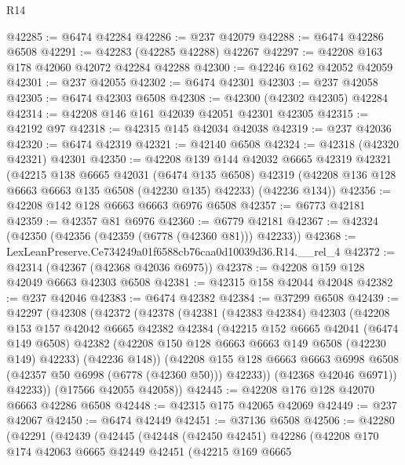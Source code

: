 \begin{lexlean}{R14}
\begin{coremodule}
@42285 := @6474 @42284
@42286 := @237 @42079
@42288 := @6474 @42286 @6508
@42291 := @42283 (@42285 @42288) @42267
@42297 := @42208 @163 @178 @42060 @42072 @42284 @42288
@42300 := @42246 @162 @42052 @42059
@42301 := @237 @42055
@42302 := @6474 @42301
@42303 := @237 @42058
@42305 := @6474 @42303 @6508
@42308 := @42300 (@42302 @42305) @42284
@42314 := @42208 @146 @161 @42039 @42051 @42301 @42305
@42315 := @42192 @97
@42318 := @42315 @145 @42034 @42038
@42319 := @237 @42036
@42320 := @6474 @42319
@42321 := @42140 @6508
@42324 := @42318 (@42320 @42321) @42301
@42350 := @42208
    @139
    @144
    @42032
    @6665
    @42319
    @42321
    (@42215
      @138
      @6665
      @42031
      (@6474 @135 @6508)
      @42319
      (@42208 @136 @128 @6663 @6663 @135 @6508 (@42230 @135) @42233)
      (@42236 @134))
@42356 := @42208 @142 @128 @6663 @6663 @6976 @6508
@42357 := @6773 @42181
@42359 := @42357 @81 @6976
@42360 := @6779 @42181
@42367 := @42324 (@42350 (@42356 (@42359 (@6778 (@42360 @81))) @42233))
@42368 := LexLeanPreserve.Ce734249a01f6588cb76caa0d10039d36.R14.__rel_4
@42372 := @42314 (@42367 (@42368 @42036 @6975))
@42378 := @42208 @159 @128 @42049 @6663 @42303 @6508
@42381 := @42315 @158 @42044 @42048
@42382 := @237 @42046
@42383 := @6474 @42382
@42384 := @37299 @6508
@42439 := @42297
    (@42308
      (@42372
        (@42378
          (@42381
            (@42383 @42384)
            @42303
            (@42208
              @153
              @157
              @42042
              @6665
              @42382
              @42384
              (@42215
                @152
                @6665
                @42041
                (@6474 @149 @6508)
                @42382
                (@42208 @150 @128 @6663 @6663 @149 @6508 (@42230 @149) @42233)
                (@42236 @148))
              (@42208
                @155
                @128
                @6663
                @6663
                @6998
                @6508
                (@42357 @50 @6998 (@6778 (@42360 @50)))
                @42233))
            (@42368 @42046 @6971))
          @42233))
      (@17566 @42055 @42058))
@42445 := @42208 @176 @128 @42070 @6663 @42286 @6508
@42448 := @42315 @175 @42065 @42069
@42449 := @237 @42067
@42450 := @6474 @42449
@42451 := @37136 @6508
@42506 := @42280
    (@42291
      (@42439
        (@42445
          (@42448
            (@42450 @42451)
            @42286
            (@42208
              @170
              @174
              @42063
              @6665
              @42449
              @42451
              (@42215
                @169
                @6665

\end{coremodule}
\end{lexlean}
